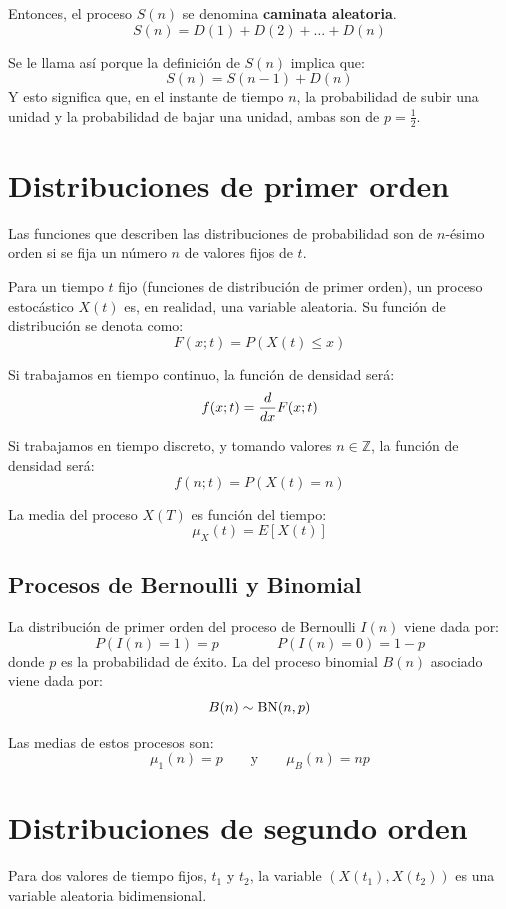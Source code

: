 \documentclass[a4paper]{book}
\begin{document}
Entonces, el proceso $S(n)$ se denomina \textbf{caminata aleatoria}.
\[ S(n) = D(1)+D(2)+\dots +D(n) \]

Se le llama así porque la definición de $S(n)$ implica que:
\[ S(n) = S(n-1) + D(n) \]
Y esto significa que, en el instante de tiempo $n$, la probabilidad de subir una unidad y la probabilidad de bajar una unidad, ambas son de $p=\frac{1}{2}$. 

\section{Distribuciones de primer orden}

Las funciones que describen las distribuciones de probabilidad son de $n$-ésimo orden si se fija un número $n$ de valores fijos de $t$.

Para un tiempo $t$ fijo (funciones de distribución de primer orden), un proceso estocástico $X(t)$ es, en realidad, una variable aleatoria. Su función de distribución se denota como:
\[ F \left( x;t \right) = P \left( X(t) \leq x \right) \]

Si trabajamos en tiempo continuo, la función de densidad será:
\[ f(x;t) = \dv{}{x} F(x;t) \]

Si trabajamos en tiempo discreto, y tomando valores $n\in \mathbb{Z}$, la función de densidad será:
\[ f \left( n;t \right) = P \left( X(t) = n \right) \]

La media del proceso $X(T)$ es función del tiempo:
\[ \mu _X (t) = E \left[ X(t) \right] \]

\subsection{Procesos de Bernoulli y Binomial}

La distribución de primer orden del proceso de Bernoulli $I(n)$ viene dada por:
\[ P \left( I(n) = 1 \right) = p \, \qquad \qquad P \left( I(n) = 0 \right) = 1-p \]
donde $p$ es la probabilidad de éxito. La del proceso binomial $B(n)$ asociado viene dada por:
\[ B(n)\sim \operatorname{BN} (n,p) \]

Las medias de estos procesos son:
\[ \mu _1 (n) = p \qquad \text{y} \qquad  \mu _B (n) = np\]

\section{Distribuciones de segundo orden}

Para dos valores de tiempo fijos, $t_1$ y $t_2$, la variable $\left( X(t_1), X(t_2) \right)$ es una variable aleatoria bidimensional.
\end{document}
